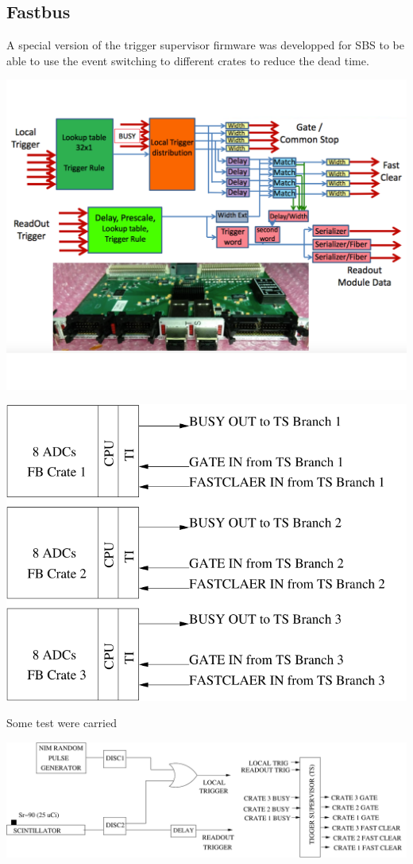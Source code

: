 \documentclass{article}
\begin{document}
\subsection{Fastbus}
A special version of the trigger supervisor firmware was developped for SBS to be able to use the event switching to different crates to reduce the dead time.

\includegraphics[scale=0.4]{figs/fastbus/TS.pdf}

\includegraphics[scale=0.4]{figs/fastbus/FBCrates.pdf}

Some test were carried

\includegraphics[scale=0.4]{figs/fastbus/Trigger_TS.pdf}
\end{document}
